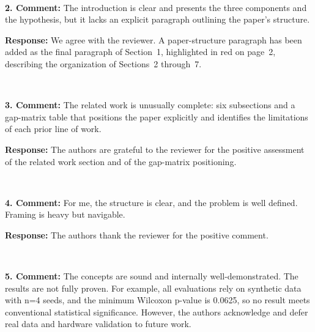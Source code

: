 \documentclass[1p,12pt,authoryear]{elsarticle}
\begin{document}
~

\noindent \textbf{2. Comment:} The introduction is clear and presents the three components and the hypothesis, but it lacks an explicit paragraph outlining the paper's structure.

\vspace{2mm}
\noindent \textbf{Response:} We agree with the reviewer. A paper-structure paragraph has been added as the final paragraph of Section~1, highlighted in red on page~2, describing the organization of Sections~2 through~7.

~

\noindent \textbf{3. Comment:} The related work is unusually complete: six subsections and a gap-matrix table that positions the paper explicitly and identifies the limitations of each prior line of work.

\vspace{2mm}
\noindent \textbf{Response:} The authors are grateful to the reviewer for the positive assessment of the related work section and of the gap-matrix positioning.

~

\noindent \textbf{4. Comment:} For me, the structure is clear, and the problem is well defined. Framing is heavy but navigable.

\vspace{2mm}
\noindent \textbf{Response:} The authors thank the reviewer for the positive comment.

~

\noindent \textbf{5. Comment:} The concepts are sound and internally well-demonstrated. The results are not fully proven. For example, all evaluations rely on synthetic data with n=4 seeds, and the minimum Wilcoxon p-value is 0.0625, so no result meets conventional statistical significance. However, the authors acknowledge and defer real data and hardware validation to future work.
\end{document}
